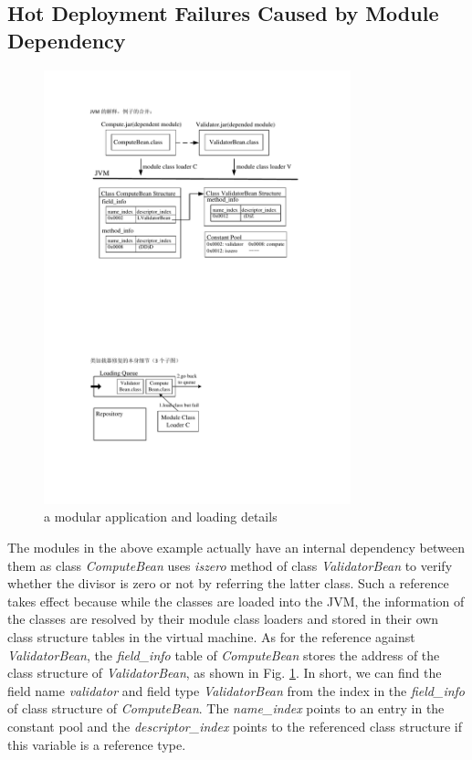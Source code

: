 \documentclass[conference]{IEEEtran}
\begin{document}
\subsection{Hot Deployment Failures Caused by Module Dependency}

\begin{figure}[ht]
\centering
\includegraphics[width=3.5in]{ExampleJVM.pdf}
\caption{a modular application and loading details}
\label{fig:example_jvm}
\end{figure}

The modules in the above example actually have an internal dependency between them as class \emph{ComputeBean} uses \emph{iszero} method of class \emph{ValidatorBean} to verify whether the divisor is zero or not by referring the latter class. Such a reference takes effect because while the classes are loaded into the JVM\cite{jvm}, the information of the classes are resolved by their module class loaders and stored in their own class structure tables in the virtual machine. As for the reference against \emph{ValidatorBean}, the \emph{field\_info} table of \emph{ComputeBean} stores the address of the class structure of \emph{ValidatorBean}, as shown in Fig. \ref{fig:example_jvm}. In short, we can find the field name \emph{validator} and field type \emph{ValidatorBean} from the index in the \emph{field\_info} of class structure of \emph{ComputeBean}. 
The \emph{name\_index} points to an entry in the constant pool and the \emph{descriptor\_index} points to the referenced class structure if this variable is a reference type\cite{jvm_book}. 
\end{document}
